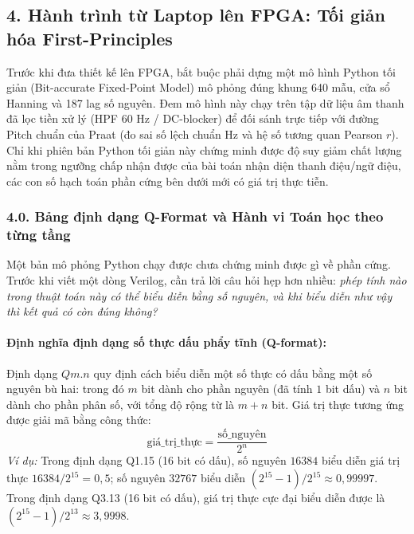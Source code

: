 \documentclass[11pt,a4paper]{article}
\begin{document}
\subsection*{4. Hành trình từ Laptop lên FPGA: Tối giản hóa First-Principles}

\begin{verifygate}
Trước khi đưa thiết kế lên FPGA, bắt buộc phải dựng một mô hình Python tối giản (Bit-accurate Fixed-Point Model) mô phỏng đúng khung 640 mẫu, cửa sổ Hanning và 187 lag số nguyên. Đem mô hình này chạy trên tập dữ liệu âm thanh đã lọc tiền xử lý (HPF 60 Hz / DC-blocker) để đối sánh trực tiếp với đường Pitch chuẩn của Praat (đo sai số lệch chuẩn Hz và hệ số tương quan Pearson $r$). Chỉ khi phiên bản Python tối giản này chứng minh được độ suy giảm chất lượng nằm trong ngưỡng chấp nhận được của bài toán nhận diện thanh điệu/ngữ điệu, các con số hạch toán phần cứng bên dưới mới có giá trị thực tiễn.
\end{verifygate}

\subsubsection*{4.0. Bảng định dạng Q-Format và Hành vi Toán học theo từng tầng}

Một bản mô phỏng Python chạy được chưa chứng minh được gì về phần cứng. Trước khi viết một dòng Verilog, cần trả lời câu hỏi hẹp hơn nhiều: \emph{phép tính nào trong thuật toán này có thể biểu diễn bằng số nguyên, và khi biểu diễn như vậy thì kết quả có còn đúng không?}

\paragraph{Định nghĩa định dạng số thực dấu phẩy tĩnh (Q-format):}
Định dạng $Qm.n$ quy định cách biểu diễn một số thực có dấu bằng một số nguyên bù hai: trong đó $m$ bit dành cho phần nguyên (đã tính $1$ bit dấu) và $n$ bit dành cho phần phân số, với tổng độ rộng từ là $m + n$ bit. Giá trị thực tương ứng được giải mã bằng công thức:
\begin{equation}
\text{giá\_trị\_thực} = \frac{\text{số\_nguyên}}{2^n}
\end{equation}
\textit{Ví dụ:} Trong định dạng Q1.15 (16 bit có dấu), số nguyên $16384$ biểu diễn giá trị thực $16384 / 2^{15} = 0{,}5$; số nguyên $32767$ biểu diễn $(2^{15}-1)/2^{15} \approx 0{,}99997$. Trong định dạng Q3.13 (16 bit có dấu), giá trị thực cực đại biểu diễn được là $(2^{15}-1)/2^{13} \approx 3{,}9998$.
\end{document}
